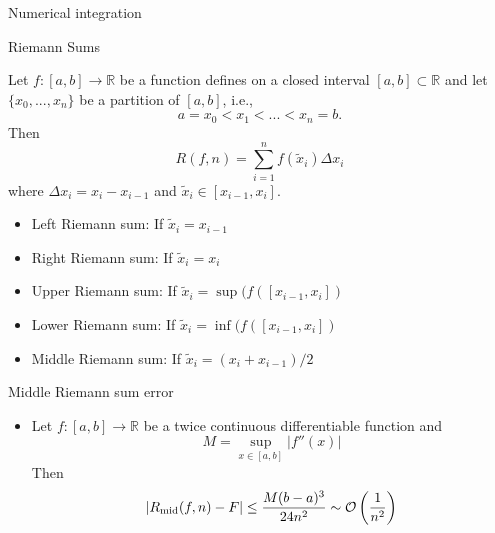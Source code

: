\documentclass{beamer}
\newcommand{\bitem}{\item[$\bullet$]}
\begin{document}
\begin{frame}{Numerical integration}
{}



\end{frame}


\begin{frame}{Riemann Sums}

Let $f:[a,b] \to \mathbb{R}$ be a function defines on a closed interval $[a,b]\subset \mathbb{R}$ and let $\{x_0,...,x_n\}$ be a partition of $[a,b]$, i.e.,
$$
a = x_0 <x_1 <...<x_n = b.
$$
Then
$$
R(f,n)
=
\sum_{i=1}^{n} f(\tilde{x}_{i}) \Delta x_i
$$
where $\Delta x_i = x_i - x_{i-1}$ and $\tilde{x}_i \in [x_{i-1}, x_i]$.

\begin{itemize}
    \bitem Left Riemann sum: If $\tilde{x}_i = x_{i-1}$ 
    \bitem Right Riemann sum: If $\tilde{x}_i = x_i$
    \bitem Upper Riemann sum: If $\tilde{x}_i = \sup(f([x_{i-1}, x_i])$ 
    \bitem Lower Riemann sum: If $\tilde{x}_i = \inf(f([x_{i-1}, x_i])$ 
    \bitem Middle Riemann sum: If $\tilde{x}_i = (x_i + x_{i-1})/2$
\end{itemize}
    
\end{frame}

\begin{frame}{Middle Riemann sum error}

\pause

\begin{itemize}
    \bitem Let $f:[a,b] \to \mathbb{R}$ be a twice continuous differentiable function and 
    $$
    M = \sup_{x\in [a,b]} |f''(x)|
    $$
    Then
    $$
    |R_{\rm mid}(f,n) - F| \leq \frac{M (b-a)^3}{24n^2} \sim \mathcal{O}\left( \frac{1}{n^2}\right)
    $$
\end{itemize}

    
\end{frame}
\end{document}
